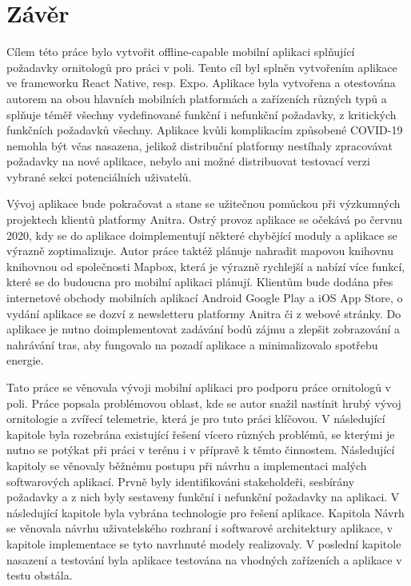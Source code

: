 \chapter*{Závěr}

Cílem této práce bylo vytvořit offline-capable mobilní aplikaci splňující požadavky ornitologů pro práci v poli. Tento cíl byl splněn vytvořením aplikace ve frameworku React Native, resp. Expo. Aplikace byla vytvořena a otestována autorem na obou hlavních mobilních platformách a zařízeních různých typů a splňuje téměř všechny vydefinované funkční i nefunkční požadavky, z kritických funkčních požadavků všechny. Aplikace kvůli komplikacím způsobené COVID-19 nemohla být včas nasazena, jelikož distribuční platformy nestíhaly zpracovávat požadavky na nové aplikace, nebylo ani možné distribuovat testovací verzi vybrané sekci potenciálních uživatelů. 

Vývoj aplikace bude pokračovat a stane se užitečnou pomůckou při výzkumných projektech klientů platformy Anitra. Ostrý provoz aplikace se očekává po červnu 2020, kdy se do aplikace doimplementují některé chybějící moduly a aplikace se výrazně zoptimalizuje. Autor práce taktéž plánuje nahradit mapovou knihovnu knihovnou od společnosti Mapbox, která je výrazně rychlejší a nabízí více funkcí, které se do budoucna pro mobilní aplikaci plánují. Klientům bude dodána přes internetové obchody mobilních aplikací Android Google Play a iOS App Store, o vydání aplikace se dozví z newsletteru platformy Anitra či z webové stránky. Do aplikace je nutno doimplementovat zadávání bodů zájmu a zlepšit zobrazování a nahrávání tras, aby fungovalo na pozadí aplikace a minimalizovalo spotřebu energie.

Tato práce se věnovala vývoji mobilní aplikaci pro podporu práce ornitologů v poli. Práce popsala problémovou oblast, kde se autor snažil nastínit hrubý vývoj ornitologie a zvířecí telemetrie, která je pro tuto práci klíčovou. V následující kapitole byla rozebrána existující řešení vícero různých problémů, se kterými je nutno se potýkat při práci v terénu i v přípravě k těmto činnostem. Následující kapitoly se věnovaly běžnému postupu při návrhu a implementaci malých softwarových aplikací. Prvně byly identifikováni stakeholdeři, sesbírány požadavky a z nich byly sestaveny funkční i nefunkční požadavky na aplikaci. V následující kapitole byla vybrána technologie pro řešení aplikace. Kapitola Návrh se věnovala návrhu uživatelského rozhraní i softwarové architektury aplikace, v kapitole implementace se tyto navrhnuté modely realizovaly. V poslední kapitole nasazení a testování byla aplikace testována na vhodných zařízeních a aplikace v testu obstála.